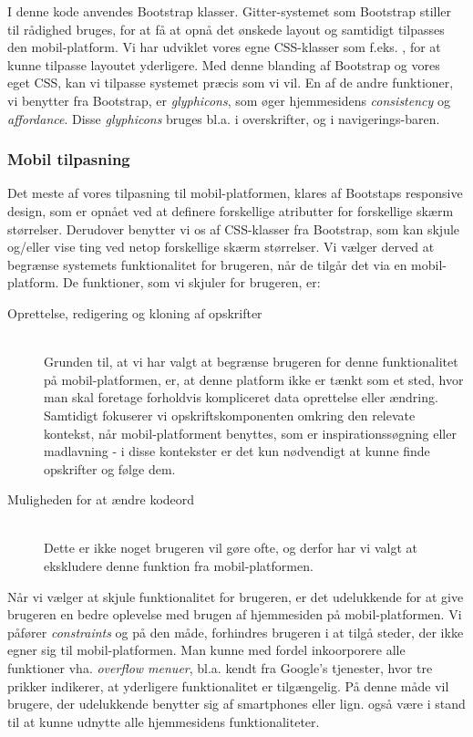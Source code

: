 I denne kode anvendes Bootstrap klasser. 
Gitter-systemet som Bootstrap stiller til rådighed bruges, for at få at opnå det ønskede layout og samtidigt tilpasses den mobil-platform.
Vi har udviklet vores egne CSS-klasser som f.eks. , for at kunne tilpasse layoutet yderligere. 
Med denne blanding af Bootstrap og vores eget CSS, kan vi tilpasse systemet præcis som vi vil. 
En af de andre funktioner, vi benytter fra Bootstrap, er \textit{glyphicons}, som øger hjemmesidens \textit{consistency} og \textit{affordance}.
Disse \textit{glyphicons} bruges bl.a. i overskrifter, og i navigerings-baren.

\subsubsection{Mobil tilpasning}
Det meste af vores tilpasning til mobil-platformen, klares af Bootstaps responsive design, som er opnået ved at definere forskellige atributter for forskellige skærm størrelser.
Derudover benytter vi os af CSS-klasser fra Bootstrap, som kan skjule og/eller vise ting ved netop forskellige skærm størrelser.
Vi vælger derved at begrænse systemets funktionalitet for brugeren, når de tilgår det via en mobil-platform. 
De funktioner, som vi skjuler for brugeren, er:
\begin{description}
\item[Oprettelse, redigering og kloning af opskrifter]\hfill\\
Grunden til, at vi har valgt at begrænse brugeren for denne funktionalitet på mobil-platformen, er, at denne platform ikke er tænkt som et sted, hvor man skal foretage forholdvis kompliceret data oprettelse eller ændring.
Samtidigt fokuserer vi opskriftskomponenten omkring den relevate kontekst, når mobil-platforment benyttes, som er inspirationssøgning eller madlavning - i disse kontekster er det kun nødvendigt at kunne finde opskrifter og følge dem.
\item[Muligheden for at ændre kodeord]\hfill\\
Dette er ikke noget brugeren vil gøre ofte, og derfor har vi valgt at ekskludere denne funktion fra mobil-platformen.
\end{description}

Når vi vælger at skjule funktionalitet for brugeren, er det udelukkende for at give brugeren en bedre oplevelse med brugen af hjemmesiden på mobil-platformen.
Vi påfører \textit{constraints} og på den måde, forhindres brugeren i at tilgå steder, der ikke egner sig til mobil-platformen.
Man kunne med fordel inkoorporere alle funktioner vha. \textit{overflow menuer}, bl.a. kendt fra Google's tjenester, hvor tre prikker indikerer, at yderligere funktionalitet er tilgængelig. \cite{actionbar}
På denne måde vil brugere, der udelukkende benytter sig af smartphones eller lign. også være i stand til at kunne udnytte alle hjemmesidens funktionaliteter.

